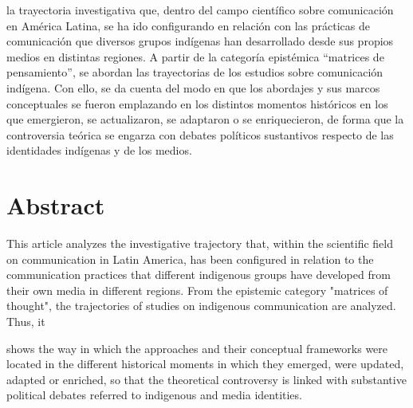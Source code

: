 \documentclass{tufte-handout}
\begin{document}
\begin{titlepage}
\vspace*{1em}


 la trayectoria investigativa que, dentro del campo
científico sobre comunicación en América Latina, se ha ido configurando
en relación con las prácticas de comunicación que diversos grupos
indígenas han desarrollado desde sus propios medios en distintas
regiones. A partir de la categoría epistémica ``matrices de
pensamiento'', se abordan las trayectorias de los estudios sobre
comunicación indígena. Con ello, se da cuenta del modo en que los
abordajes y sus marcos conceptuales se fueron emplazando en los
distintos momentos históricos en los que emergieron, se actualizaron, se
adaptaron o se enriquecieron, de forma que la controversia teórica se
engarza con debates políticos sustantivos respecto de las identidades
indígenas y de los medios.

\hypertarget{abstract}{%
\section{Abstract}\label{abstract}}

This article analyzes the investigative trajectory that, within the
scientific field on communication in Latin America, has been configured
in relation to the communication practices that different indigenous
groups have developed from their own media in different regions. From
the epistemic category "matrices of thought", the trajectories of
studies on indigenous communication are analyzed. Thus, it 

\enlargethispage{2\baselineskip}

\vspace*{2em}





 \end{titlepage}

\noindent shows the way
in which the approaches and their conceptual frameworks were located in
the different historical moments in which they emerged, were updated,
adapted or enriched, so that the theoretical controversy is linked with
substantive political debates referred to indigenous and media
identities.
\end{document}

